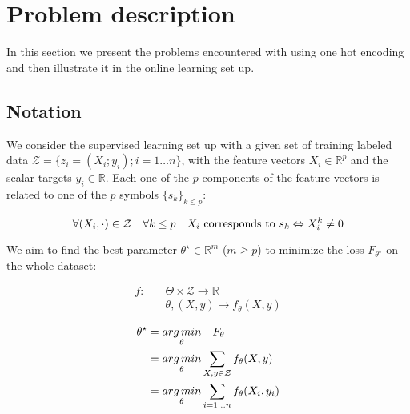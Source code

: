 \section{Problem description}



In this section we present the  problems encountered with using one hot encoding and then illustrate it in the online learning set up.


\subsection{Notation}\label{notations}

We consider the supervised learning set up with a given set of training labeled data $\mathcal{Z} = \{ z_i = (X_i; y_i); i = 1 \dots  n \}$, with the feature
vectors $X_i \in \mathbb{R}^p$ and the scalar targets $y_i \in \mathbb{R}$. Each one of the $p$ components of the feature vectors is related to one of the $p$ symbols $\{ s_k\}_{k \leq p}$:

\begin{equation} \label{eq:symbol}
    \forall (X_i, \cdot) \in \mathcal{Z} \quad \forall k \leq p \quad X_i \text{ corresponds to } s_k \Leftrightarrow X_{i}^k \neq 0
\end{equation}

We aim to find the best parameter $\theta^\star \in \mathbb{R}^m$ ($m \geq p$) to minimize the loss $F_{\theta^\star}$ on the whole dataset:

\begin{align*}
    f: \quad &\Theta \times \mathcal{Z} \longrightarrow \mathbb{R}\\
            &\theta, (X,y) \longrightarrow  f_{\theta}(X,y)
\end{align*}

\begin{align*}
\theta^\star &= \underset{\theta}{arg\,min} \quad F_\theta\\
             &= \underset{\theta}{arg\,min} \sum_{X,y \in \mathcal{Z}} f_\theta (X,y)\\
             &= \underset{\theta}{arg\,min} \sum_{i=1\dots n} f_\theta (X_i,y_i)
\end{align*}

